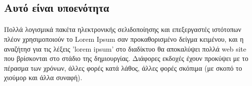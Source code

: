     \subsection{Αυτό είναι υποενότητα}
    \paragraph{}
    Πολλά λογισμικά πακέτα ηλεκτρονικής σελιδοποίησης και επεξεργαστές ιστότοπων πλέον χρησιμοποιούν το Lorem Ipsum σαν
    προκαθορισμένο δείγμα κειμένου, και η αναζήτησ για τις λέξεις 'lorem ipsum' στο διαδίκτυο θα αποκαλύψει πολλά web site
    που βρίσκονται στο στάδιο της δημιουργίας. Διάφορες εκδοχές έχουν προκύψει με το πέρασμα των χρόνων, άλλες φορές κατά
    λάθος, άλλες φορές σκόπιμα (με σκοπό το χιούμορ και άλλα συναφή).

    \begin{table}[h!]
        \centering
        \caption{Fisher's Iris data}
        \label{tab:table1}
    \end{table}

\newpage
